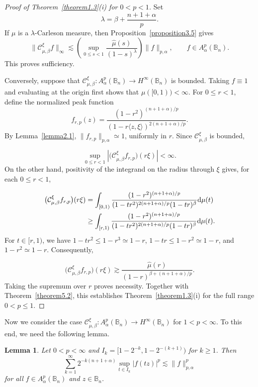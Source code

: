 \documentclass[preprint,12pt,times]{elsarticle}
\newtheorem{lemma}[theorem]{Lemma}
\theoremstyle{definition}
\theoremstyle{remark}
\numberwithin{equation}{section}
\begin{document}
 \begin{proof}[Proof of Theorem~\ref{theorem1.3}(i) for $0<p<1$]
Set
\[
  \lambda=\beta+\frac{n+1+\alpha}{p}.
\]
If $\mu$ is a $\lambda$-Carleson measure, then Proposition~\ref{proposition3.5} gives
\[
  \|\mathcal C_{\mu,\beta}^{\xi}f\|_\infty
  \lesssim
  \left(\sup_{0\leq s<1}\frac{\hat\mu(s)}{(1-s)^\lambda}\right)
  \|f\|_{p,\alpha},
  \qquad f\in A_\alpha^p(\mathbb B_n).
\]
This proves sufficiency.


Conversely, suppose that
$\mathcal C_{\mu,\beta}^{\xi}:A_\alpha^p(\mathbb B_n)\to
H^\infty(\mathbb B_n)$ is bounded. Taking $f\equiv1$ and evaluating at the
origin first shows that $\mu([0,1))<\infty$. For $0\leq r<1$, define the
normalized peak function
\[
  f_{r,p}(z)=\frac{(1-r^2)^{(n+1+\alpha)/p}}{(1-r\langle z,\xi\rangle)^{2(n+1+\alpha)/p}}.
\]
By Lemma~\ref{lemma2.1}, $\|f_{r,p}\|_{p,\alpha}\simeq1$, uniformly in
$r$. Since $\mathcal C_{\mu,\beta}^{\xi}$ is bounded,

\[
  \sup_{0\leq r<1}
  \left|\big(\mathcal C_{\mu,\beta}^{\xi}f_{r,p}\big)(r\xi)\right|<\infty.
\]
On the other hand, positivity of the integrand on the radius through $\xi$ gives, for each $0\leq r<1$,

\[
{
\begin{aligned}
  \big(\mathcal C_{\mu,\beta}^{\xi}f_{r,p}\big)(r\xi)
  &=\int_{[0,1)}
  \frac{(1-r^2)^{(n+1+\alpha)/p}}{(1-tr^2)^{2(n+1+\alpha)/p}(1-tr)^\beta}
  {\rm d}\mu(t)\\
  &\geq\int_{[r,1)}
  \frac{(1-r^2)^{(n+1+\alpha)/p}}{(1-tr^2)^{2(n+1+\alpha)/p}(1-tr)^\beta}
  {\rm d}\mu(t).
\end{aligned}}
\]
For $t\in[r,1)$, we have
$1-tr^2\leq1-r^3\simeq1-r$, $1-tr\leq1-r^2\simeq1-r$, and
$1-r^2\simeq1-r$. Consequently,

\[
  \big(\mathcal C_{\mu,\beta}^{\xi}f_{r,p}\big)(r\xi)
  \gtrsim
  \frac{\hat\mu(r)}{(1-r)^{\beta+(n+1+\alpha)/p}}.
\]
Taking the supremum over $r$ proves necessity.
Together with Theorem~\ref{theorem5.2}, this establishes
Theorem~\ref{theorem1.3}(i) for the full range $0<p\leq1$.
\end{proof}

 Now we consider the case $\mathcal{C}_{\mu,\beta}^{\xi}: 
 A_{\alpha}^p(\mathbb{B}_n)\to H^{\infty}(\mathbb{B}_n)$ for $1<p<\infty$. To this end, we need the following lemma.

\begin{lemma}\label{lemma5.3}
Let $0<p<\infty$ and $I_k=[1-2^{-k}, 1-2^{-(k+1)})$ for $k\geq 1$. Then
\begin{equation}\label{equa5.2}
\sum_{k=1}^{\infty}2^{-k(n+1+\alpha)}\sup_{t\in I_k}|f(tz)|^p\lesssim \|f\|_{p,\alpha}^p
\end{equation}
for all $f\in A_{\alpha}^p(\mathbb{B}_n)$ and $z\in\mathbb{B}_n$.
\end{lemma}
\end{document}
